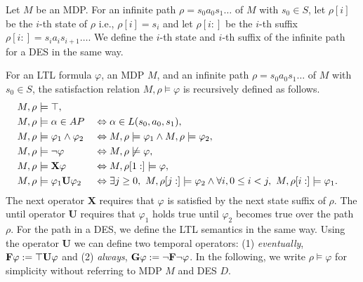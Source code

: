 \documentclass[a4j,12pt,oneside,openany,english,dvipdfmx]{jsbook}
\begin{document}
Let $ M $ be an MDP.
For an infinite path $\rho = s_0a_0s_1 \ldots $ of $ M $ with $ s_0 \in S $, let $\rho[i]$ be the $i$-th state of $\rho$ i.e., $\rho[i]=s_i$ and let $\rho[i:]$ be the $i$-th suffix $\rho[i:]=s_ia_is_{i+1} \ldots $. We define the $i$-th state and $i$-th suffix of the infinite path for a DES in the same way.
\begin{definition}
	For an LTL formula $\varphi$, an MDP $M$, and an infinite path $\rho = s_0a_0s_1 \ldots$ of $ M $ with $ s_0 \in S $, the satisfaction relation $M,\rho \models \varphi$ is recursively defined as follows.
	\begin{alignat}{2}
	& M, \rho \models \top,\nonumber \\
	& M, \rho \models \alpha \in AP &&\Leftrightarrow \alpha \in L(s_0,a_0,s_1),\nonumber \\
	& M, \rho \models \varphi_1 \land \varphi_2 &&\Leftrightarrow M, \rho \models \varphi_1 \land M, \rho \models \varphi_2,\nonumber \\
	& M, \rho \models \neg \varphi &&\Leftrightarrow M, \rho \not\models \varphi,\nonumber \\
	& M, \rho \models \text{{\bf X}}\varphi &&\Leftrightarrow M, \rho[1:] \models \varphi,\nonumber \\
	& M, \rho \models \varphi_1 \text{{\bf U}} \varphi_2 &&\Leftrightarrow \exists j \geq 0, \ M, \rho[j:] \models \varphi_2 \land \forall i, 0\leq i < j, \ M, \rho[i:] \models \varphi_1.\nonumber
	\end{alignat}
The next operator {\bf X} requires that $\varphi$ is satisfied by the next state suffix of $\rho$. The until operator {\bf U} requires that $\varphi_1$ holds true until $\varphi_2$ becomes true over the path $\rho$. For the path in a DES, we define the LTL semantics in the same way.
Using the operator {\bf U} we can define two temporal operators: (1) {\it eventually}, $\text{{\bf F}} \varphi := \top \text{{\bf U}} \varphi $ and (2) {\it always}, $\text{{\bf G}} \varphi := \neg \text{{\bf F}} \neg \varphi$.
In the following, we write $ \rho \models \varphi $ for simplicity without referring to MDP $ M $ and DES $D$.



\end{definition}
\end{document}
